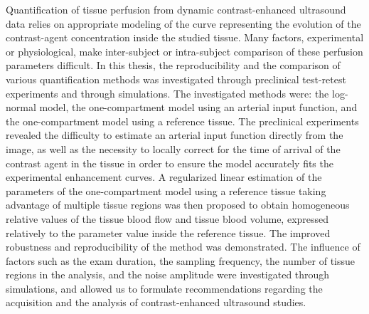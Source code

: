%
%
%
Quantification of tissue perfusion from dynamic contrast-enhanced ultrasound data relies on appropriate modeling of the curve representing the evolution of the contrast-agent concentration inside the studied tissue.
Many factors, experimental or physiological, make inter-subject or intra-subject comparison of these perfusion parameters difficult.
In this thesis, the reproducibility and the comparison of various quantification methods was investigated through preclinical test-retest experiments and through simulations.
The investigated methods were: the log-normal model, the one-compartment model using an arterial input function, and the one-compartment model using a reference tissue.
The preclinical experiments revealed the difficulty to estimate an arterial input function directly from the image, as well as the necessity to locally correct for the time of arrival of the contrast agent in the tissue in order to ensure the model accurately fits the experimental enhancement curves.
A regularized linear estimation of the parameters of the one-compartment model using a reference tissue taking advantage of multiple tissue regions was then proposed to obtain homogeneous relative values of the tissue blood flow and tissue blood volume, expressed relatively to the parameter value inside the reference tissue.
The improved robustness and reproducibility of the method was demonstrated.
The influence of factors such as the exam duration, the sampling frequency, the number of tissue regions in the analysis, and the noise amplitude were investigated through simulations, and allowed us to formulate recommendations regarding the acquisition and the analysis of contrast-enhanced ultrasound studies.
